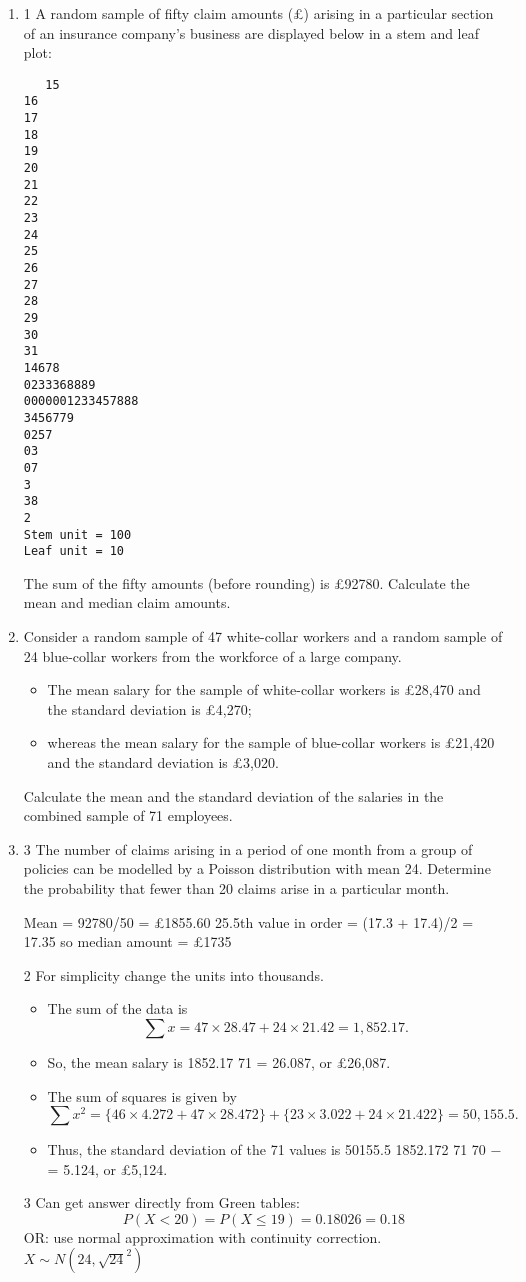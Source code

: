 \documentclass[a4paper,12pt]{article}
\begin{document}
\begin{enumerate}
\item 1 A random sample of fifty claim amounts (£) arising in a particular section of an
insurance company's business are displayed below in a stem and leaf plot:

\begin{verbatim}
   15
16
17
18
19
20
21
22
23
24
25
26
27
28
29
30
31
14678
0233368889
0000001233457888
3456779
0257
03
07
3
38
2
Stem unit = 100
Leaf unit = 10 
\end{verbatim}

The sum of the fifty amounts (before rounding) is £92780.
Calculate the mean and median claim amounts. 
\item Consider a random sample of 47 white-collar workers and a random sample of 24 blue-collar workers from the workforce of a large company. \begin{itemize}
    \item The mean salary for
the sample of white-collar workers is £28,470 and the standard deviation is £4,270; \item whereas the mean salary for the sample of blue-collar workers is £21,420
and the standard deviation is £3,020.
\end{itemize}
Calculate the mean and the standard deviation of the salaries in the combined
sample of 71 employees. 

\item 3 The number of claims arising in a period of one month from a group of policies
can be modelled by a Poisson distribution with mean 24.
Determine the probability that fewer than 20 claims arise in a particular month.



 Mean = 92780/50 = £1855.60
25.5th value in order = (17.3 + 17.4)/2 = 17.35 so median amount = £1735

2 For simplicity change the units into thousands. 
\begin{itemize}
    \item The sum of the data is
\[\sum x = 47 \times 28.47 + 24 \times  21.42 = 1,852.17.\]
\item So, the mean salary is 1852.17
71 = 26.087, or £26,087.
\item The sum of squares is given by
\[ \sum x^2 = \{46 \times 4.272 + 47 \times 28.472\} + \{23 \times 3.022 + 24 \times 21.422\} = 50,155.5.\]
\item Thus, the standard deviation of the 71 values is
50155.5 1852.172 71
70
−
= 5.124, or £5,124.
\end{itemize}
3 Can get answer directly from Green tables:
\[P(X < 20) = P(X \leq 19) = 0.18026 = 0.18\]
OR: use normal approximation with continuity correction.
$X \sim  N(24, \sqrt{24}^2 )$


\end{enumerate}
\end{document}
